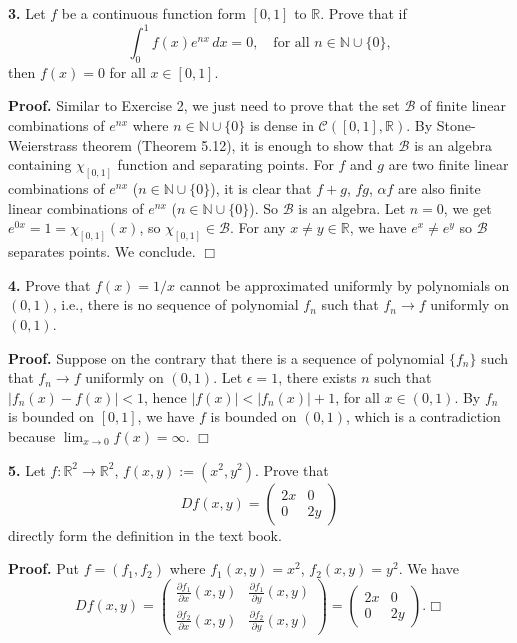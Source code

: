 \documentclass{article}
\begin{document}
    \textbf{3.} Let $f$ be a continuous function form $[0,1]$ to
$\mathbb{R}$. Prove that if
\[\int_0^1 f(x)e^{nx}\,dx = 0, \quad \text{for all } n \in \mathbb{N} \cup \{0\},\]
then $f(x) = 0$ for all $x\in [0,1]$.

\textbf{Proof.} Similar to Exercise 2, we just need to prove that the
set $\mathcal{B}$ of finite linear combinations of $e^{nx}$ where
$n \in \mathbb{N} \cup \{0\}$ is dense in
$\mathcal{C}([0,1], \mathbb{R})$. By Stone-Weierstrass theorem (Theorem
5.12), it is enough to show that $\mathcal{B}$ is an algebra containing
$\chi_{[0,1]}$ function and separating points. For $f$ and $g$ are two
finite linear combinations of $e^{nx}$ ($n\in \mathbb{N}\cup\{0\}$), it
is clear that $f+g$, $fg$, $\alpha f$ are also finite linear
combinations of $e^{nx}$ ($n\in \mathbb{N}\cup\{0\}$). So $\mathcal{B}$
is an algebra. Let $n = 0$, we get $e^{0x} = 1 = \chi_{[0,1]}(x)$, so
$\chi_{[0,1]} \in \mathcal{B}$. For any $x\ne y \in \mathbb{R}$, we have
$e^x \ne e^y$ so $\mathcal{B}$ separates points. We conclude. $\Box$

    \textbf{4.} Prove that $f(x) = 1/x$ cannot be approximated uniformly by
polynomials on $(0,1)$, i.e., there is no sequence of polynomial $f_n$
such that $f_n \to f$ uniformly on $(0,1)$.

\textbf{Proof.} Suppose on the contrary that there is a sequence of
polynomial $\{f_n\}$ such that $f_n \to f$ uniformly on $(0,1)$. Let
$\epsilon = 1$, there exists $n$ such that $|f_n(x) - f(x)| < 1$, hence
$|f(x)| < |f_n(x)| + 1$, for all $x\in (0,1)$. By $f_n$ is bounded on
$[0,1]$, we have $f$ is bounded on $(0,1)$, which is a contradiction
because $\lim_{x\to 0} f(x) = \infty$. $\Box$

    \textbf{5.} Let $f:\mathbb{R}^2 \to \mathbb{R}^2$,
$f(x,y) := (x^2,y^2)$. Prove that
\[Df(x,y) = \begin{pmatrix}2x & 0\\0 & 2y\end{pmatrix}\] directly form
the definition in the text book.

\textbf{Proof.} Put $f = (f_1,f_2)$ where $f_1(x,y) = x^2$,
$f_2(x,y) = y^2$. We have
\[Df(x,y) = \begin{pmatrix} \frac{\partial f_1}{\partial x}(x,y) & \frac{\partial f_1}{\partial y}(x,y) \\
\frac{\partial f_2}{\partial x}(x,y) & \frac{\partial f_2}{\partial y}(x,y) \end{pmatrix} = \begin{pmatrix}2x & 0\\0 & 2y\end{pmatrix} .\Box\]


    
    
    
    
\end{document}
